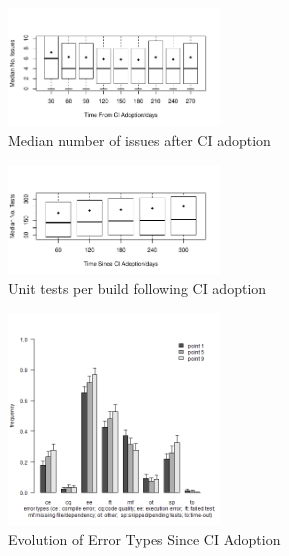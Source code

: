 \documentclass[conference]{IEEEtran}
\begin{document}
\begin{figure}[!t]
\centering
\includegraphics[width=0.5\textwidth]{issues_after.pdf}
\caption{Median number of issues after CI adoption}
\label{Fig:IssuesAfter}
\end{figure}


\begin{figure}[!t]
\centering
\includegraphics[width=0.5\textwidth]{tests.pdf}
\caption{Unit tests per build following CI adoption}
\label{Fig:Tests}
\end{figure}



\begin{figure}[!t]
\centering
\includegraphics[width=0.5\textwidth]{plot_together.png}
\caption{Evolution of Error Types Since CI Adoption}
\label{Fig:BugTypes}
\end{figure}




\end{document}
